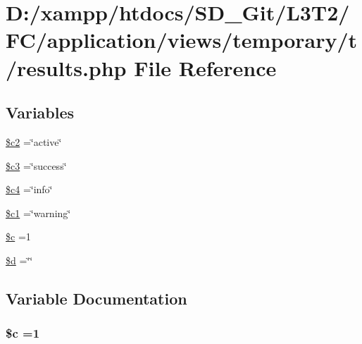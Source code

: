 \hypertarget{application_2views_2temporary_2t_2results_8php}{}\section{D\+:/xampp/htdocs/\+S\+D\+\_\+\+Git/\+L3\+T2/\+F\+C/application/views/temporary/t/results.php File Reference}
\label{application_2views_2temporary_2t_2results_8php}
\subsection*{Variables}
\begin{DoxyCompactItemize}
\item 
\hyperlink{application_2views_2temporary_2t_2results_8php_a7d0ce9eb4b126a1a12c7dade4f7ab7ef}{\$c2} =\char`\"{}active\char`\"{}
\item 
\hyperlink{application_2views_2temporary_2t_2results_8php_a78a28e488f33dbd56e562b07dc3862e3}{\$c3} =\char`\"{}success\char`\"{}
\item 
\hyperlink{application_2views_2temporary_2t_2results_8php_a480a6698b6eb8bfee885295be554a1e7}{\$c4} =\char`\"{}info\char`\"{}
\item 
\hyperlink{application_2views_2temporary_2t_2results_8php_ae8c2f379ac8fb393e500f127ae317cf0}{\$c1} =\char`\"{}warning\char`\"{}
\item 
\hyperlink{application_2views_2temporary_2t_2results_8php_ab73d7f4f2dae233dd561e7fdaab3a77b}{\$c} =1
\item 
\hyperlink{application_2views_2temporary_2t_2results_8php_a0cf5dd496d9f5ff1edf00d234771dcfe}{\$d} =\char`\"{}\char`\"{}
\end{DoxyCompactItemize}


\subsection{Variable Documentation}
\hypertarget{application_2views_2temporary_2t_2results_8php_ab73d7f4f2dae233dd561e7fdaab3a77b}{}
\subsubsection[{\$c}]{\setlength{\rightskip}{0pt plus 5cm}\${\bf c} =1}\label{application_2views_2temporary_2t_2results_8php_ab73d7f4f2dae233dd561e7fdaab3a77b}
\hypertarget{application_2views_2temporary_2t_2results_8php_ae8c2f379ac8fb393e500f127ae317cf0}{}
